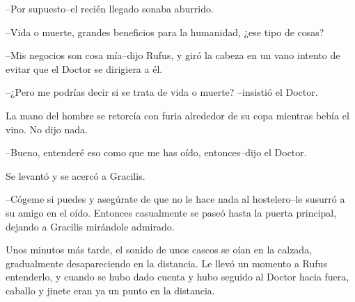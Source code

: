 --Por supuesto--el recién llegado sonaba aburrido.

--Vida o muerte, grandes beneficios para la humanidad, ¿ese tipo de
cosas?

--Mis negocios son cosa mía--dijo Rufus, y giró la cabeza en un vano
intento de evitar que el Doctor se dirigiera a él.

--¿Pero me podrías decir si se trata de vida o muerte? --insistió el
Doctor.

La mano del hombre se retorcía con furia alrededor de su copa mientras
bebía el vino. No dijo nada.

--Bueno, entenderé eso como que me has oído, entonces--dijo el Doctor.

Se levantó y se acercó a Gracilis.

--Cógeme si puedes y asegúrate de que no le hace nada al hostelero--le
susurró a su amigo en el oído. Entonces casualmente se paseó hasta la
puerta principal, dejando a Gracilis mirándole admirado.

Unos minutos más tarde, el sonido de unos cascos se oían en la calzada,
gradualmente desapareciendo en la distancia. Le llevó un momento a Rufus
entenderlo, y cuando se hubo dado cuenta y hubo seguido al Doctor hacia
fuera, caballo y jinete eran ya un punto en la distancia.
